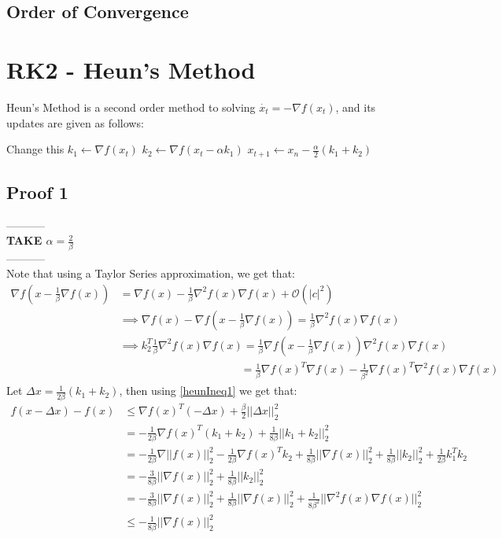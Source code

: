 \documentclass[12pt,twoside]{article}
\begin{document}
\subsection{Order of Convergence}
\section{RK2 - Heun's Method}
Heun's Method is a second order method to solving $\dot{x_t} = - \nabla f(x_t)$, and its updates are given as follows:
\begin{algorithmic}
\STATE Change this
  \STATE $k_1 \gets \nabla f(x_t)$
  \STATE $k_2 \gets \nabla f(x_t - \alpha k_1) $
  \STATE $x_{t+1} \gets x_n - \frac{\alpha}{2}(k_1 + k_2)$
\ENDFOR
\end{algorithmic}
\subsection{Proof 1}
----------- \\
\textbf{TAKE $\alpha = \frac{2}{\beta}$} \\
-----------\\
Note that using a Taylor Series approximation, we get that:
\begin{equation} \label{heunIneq1}
\begin{aligned}
\nabla f(x -  \frac{1}{\beta}\nabla f(x)) &= \nabla f(x) - \frac{1}{\beta}\nabla^2 f(x) \nabla f(x) + \mathcal{O}(|c|^2) \\
& \implies  \nabla f(x) - \nabla f(x-\frac{1}{\beta}\nabla f(x)) = \frac{1}{\beta} \nabla^2 f(x) \nabla f(x) \\
& \implies   k_2 ^T \frac{1}{\beta} \nabla^2 f(x) \nabla f(x) =  \frac{1}{\beta} \nabla f(x -  \frac{1}{\beta}\nabla f(x))  \nabla^2 f(x) \nabla f(x) \\
 &\quad \quad \quad \quad \quad \quad \quad \quad \quad \quad  \quad = \frac{1}{\beta} \nabla f(x)^T \nabla f(x) - \frac{1}{\beta^2} \nabla f(x)^T \nabla^2 f(x) \nabla f(x)
\end{aligned}
\end{equation}
Let $\Delta x = \frac{1}{2\beta}(k_1 + k_2) $, then using \eqref{heunIneq1} we get that:
\begin{equation}
\begin{aligned}
f(x - \Delta x) - f(x) &\leq \nabla f(x)^T ( - \Delta x) + \frac{\beta}{2}|| \Delta x||_2^2 \\
& = - \frac{1}{2\beta}\nabla f(x)^T (k_1 + k_2) + \frac{1}{8\beta}||k_1 + k_2 ||_2^2 \\
& = - \frac{1}{2\beta}\nabla ||f(x)||_2^2 - \frac{1}{2\beta}\nabla f(x)^T k_2 + \frac{1}{8\beta}||\nabla f(x)||_2^2 + \frac{1}{8\beta}||k_2||_2^2 + \frac{1}{2\beta}k_1^T k_2 \\
& = -\frac{3}{8\beta}||\nabla f(x)||_2^2 + \frac{1}{8\beta}||k_2||_2^2 \\
& = -\frac{3}{8\beta}||\nabla f(x)||_2^2 + \frac{1}{8\beta}||\nabla f(x)||_2^2 + \frac{1}{8\beta^2}||\nabla^2 f(x) \nabla f(x)||_2^2 \\
& \leq - \frac{1}{8\beta}|| \nabla f(x)||_2^2
\end{aligned}
\end{equation}
\end{document}
